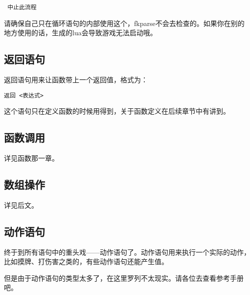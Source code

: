 \begin{verbatim}
 中止此流程
\end{verbatim}

请确保自己只在循环语句的内部使用这个，fkparse不会去检查的。如果你在别的地方使用的话，生成的lua会导致游戏无法启动哦。

\subsection{返回语句}

返回语句用来让函数带上一个返回值，格式为：

\begin{verbatim}
返回 <表达式>
\end{verbatim}

这个语句只在定义函数的时候用得到，关于函数定义在后续章节中有讲到。

\subsection{函数调用}

详见函数那一章。

\subsection{数组操作}

详见后文。

\subsection{动作语句}

终于到所有语句中的重头戏——动作语句了。动作语句用来执行一个实际的动作，比如摸牌、打伤害之类的，有些动作语句还能产生值。

但是由于动作语句的类型太多了，在这里罗列不太现实。请各位去查看参考手册吧。

